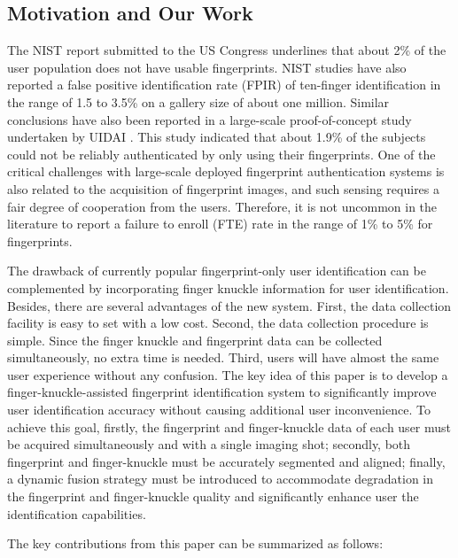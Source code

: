 \subsection{Motivation and Our Work\label{motivation-contribution}}

The NIST report submitted to the US Congress \cite{2002SUMMARYON} underlines that about 2\% of the user population does not have usable fingerprints. NIST studies have also reported a false positive identification rate (FPIR) of ten-finger identification in the range of 1.5 to 3.5\% on a gallery size of about one million. Similar conclusions have also been reported in a large-scale proof-of-concept study undertaken by UIDAI \cite{uidai}. This study indicated that about 1.9\% of the subjects could not be reliably authenticated by only using their fingerprints. One of the critical challenges with large-scale deployed fingerprint authentication systems is also related to the acquisition of fingerprint images, and such sensing requires a fair degree of cooperation from the users. Therefore, it is not uncommon in the literature to report a failure to enroll (FTE) rate in the range of 1\% to 5\% for fingerprints. 

The drawback of currently popular fingerprint-only user identification can be complemented by incorporating finger knuckle information for user identification. Besides, there are several advantages of the new system. First, the data collection facility is easy to set with a low cost. Second, the data collection procedure is simple. Since the finger knuckle and fingerprint data can be collected simultaneously, no extra time is needed. Third, users will have almost the same user experience without any confusion. The key idea of this paper is to develop a finger-knuckle-assisted fingerprint identification system to significantly improve user identification accuracy without causing additional user inconvenience. To achieve this goal, firstly, the fingerprint and finger-knuckle data of each user must be acquired simultaneously and with a single imaging shot; secondly, both fingerprint and finger-knuckle must be accurately segmented and aligned; finally, a dynamic fusion strategy must be introduced to accommodate degradation in the fingerprint and finger-knuckle quality and significantly enhance user the identification capabilities.

The key contributions from this paper can be summarized as follows: 

